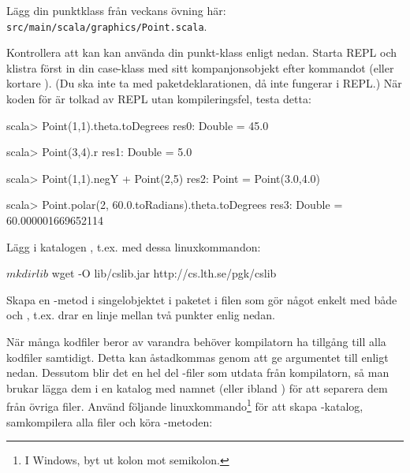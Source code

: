 \Task Lägg din punktklass från veckans övning här:\\ \texttt{src/main/scala/graphics/Point.scala}.

Kontrollera att kan kan använda din punkt-klass enligt nedan. Starta REPL och klistra först in din case-klass med sitt kompanjonsobjekt efter kommandot  (eller kortare ). (Du ska inte ta med paketdeklarationen, då  inte fungerar i REPL.) När koden för  är tolkad av REPL utan kompileringsfel, testa detta:
\begin{REPLnonum}
scala> Point(1,1).theta.toDegrees
res0: Double = 45.0

scala> Point(3,4).r
res1: Double = 5.0

scala> Point(1,1).negY + Point(2,5)
res2: Point = Point(3.0,4.0)

scala> Point.polar(2, 60.0.toRadians).theta.toDegrees
res3: Double = 60.000001669652114
\end{REPLnonum}


\Task Lägg  i katalogen , t.ex. med dessa linuxkommandon:
\begin{REPLnonum}
$ mkdir lib
$ wget -O lib/cslib.jar http://cs.lth.se/pgk/cslib
\end{REPLnonum}

\Task Skapa en -metod i singelobjektet  i paketet  i filen  
som gör något enkelt med både  och , t.ex. drar en linje mellan två punkter enlig nedan.

\noindent När många kodfiler beror av varandra behöver kompilatorn ha tillgång till alla kodfiler samtidigt.  Detta kan åstadkommas genom att ge argumentet  till  enligt nedan. Dessutom blir det en hel del -filer som utdata från kompilatorn, så man brukar lägga dem i en katalog med namnet  (eller ibland ) för att separera dem från övriga filer. Använd följande linuxkommando\footnote{I Windows, byt ut kolon mot semikolon.} för att skapa -katalog, samkompilera alla filer och köra -metoden:


